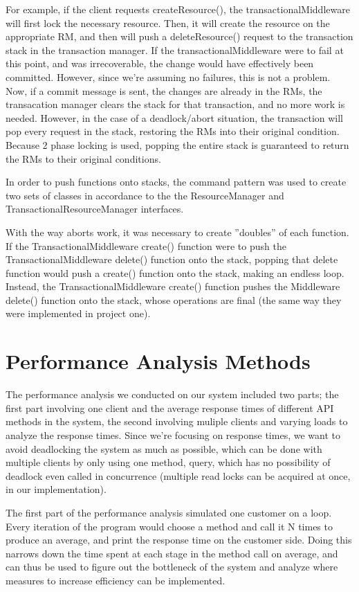 \documentclass[letterpaper,12pt]{article}
\begin{document}
For example, if the client requests createResource(), the transactionalMiddleware will first lock the necessary resource. Then, it will create the resource on the appropriate RM, and then will push a deleteResource() request to the transaction stack in the transaction manager. If the transactionalMiddleware were to fail at this point, and was irrecoverable, the change would have effectively been committed. However, since we're assuming no failures, this is not a problem. Now, if a commit message is sent, the changes are already in the RMs, the transacation manager clears the stack for that transaction, and no more work is needed. However, in the case of a deadlock/abort situation, the transaction will pop every request in the stack, restoring the RMs into their original condition. Because 2 phase locking is used, popping the entire stack is guaranteed to return the RMs to their original conditions.

In order to push functions onto stacks, the command pattern was used to create two sets of classes in accordance to the the ResourceManager and TransactionalResourceManager interfaces.

With the way aborts work, it was necessary to create ''doubles'' of each function. If the TransactionalMiddleware create() function were to push the TransactionalMiddleware delete() function onto the stack, popping that delete function would push a create() function onto the stack, making an endless loop. Instead, the TransactionalMiddleware create() function pushes the Middleware delete() function onto the stack, whose operations are final (the same way they were implemented in project one).

\section{Performance Analysis Methods}

The performance analysis we conducted on our system included two parts; the first part involving one client and the average response times of different API methods in the system, the second involving muliple clients and varying loads to analyze the response times. Since we're focusing on response times, we want to avoid deadlocking the system as much as possible, which can be done with multiple clients by only using one method, query, which has no possibility of deadlock even called in concurrence (multiple read locks can be acquired at once, in our implementation). 

The first part of the performance analysis simulated one customer on a loop. Every iteration of the program would choose a method and call it N times to produce an average, and print the response time on the customer side. Doing this narrows down the time spent at each stage in the method call on average, and can thus be used to figure out the bottleneck of the system and analyze where measures to increase efficiency can be implemented.
\end{document}
